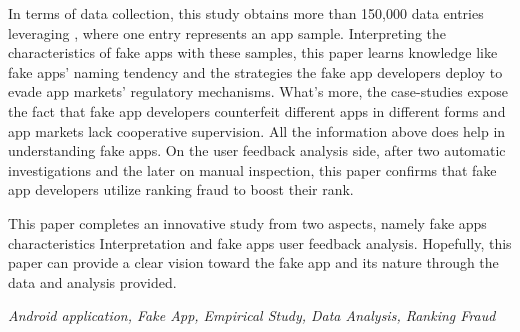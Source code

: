 In terms of data collection, this study obtains more than 150,000 data entries leveraging \mytool, where one entry represents an app sample.
Interpreting the characteristics of fake apps with these samples, this paper learns knowledge like fake apps' naming tendency and the strategies the fake app developers deploy to evade app markets' regulatory mechanisms.
What's more, the case-studies expose the fact that fake app developers counterfeit different apps in different forms and app markets lack cooperative supervision.
All the information above does help in understanding fake apps.
On the user feedback analysis side, after two automatic investigations and the later on manual inspection, this paper confirms that fake app developers utilize ranking fraud to boost their rank.

This paper completes an innovative study from two aspects, namely fake apps characteristics Interpretation and fake apps user feedback analysis.
Hopefully, this paper can provide a clear vision toward the fake app and its nature through the data and analysis provided.

{} \textit{Android application, Fake App, Empirical Study, Data Analysis, Ranking Fraud}
